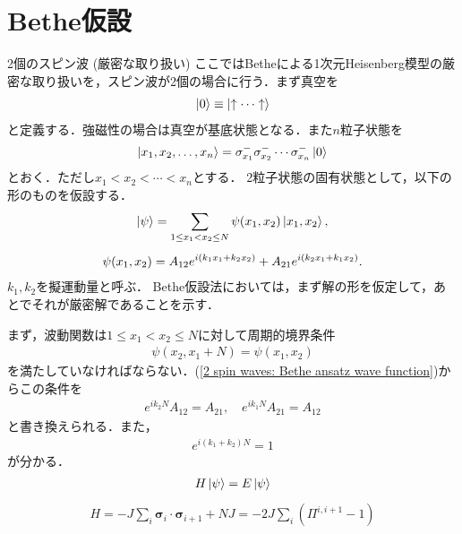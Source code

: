 \documentclass[\main/main.tex]{subfiles}
\begin{document}
\section{Bethe仮設}
\begin{frame}{2個のスピン波 (厳密な取り扱い)}
    ここではBetheによる1次元Heisenberg模型の厳密な取り扱いを，スピン波が2個の場合に行う．まず真空を
    \begin{align}
        \ket{0} \equiv \ket{\uparrow \cdots \uparrow}
    \end{align}
    と定義する．強磁性の場合は真空が基底状態となる．また$n$粒子状態を
    \begin{align}
        \ket{x_1, x_2, \ldots, x_n} = \sigma_{x_1}^- \sigma_{x_2}^- \cdots \sigma_{x_n}^-\ket{0}
    \end{align}
    とおく．ただし$x_1 < x_2 < \cdots < x_n$とする．
    2粒子状態の固有状態として，以下の形のものを仮設する．
    \begin{gather}
        \ket{\psi} = \sum_{1 \le x_1 < x_2 \le N} \psi(x_1, x_2)\ket{x_1, x_2},
        \\[5pt]
        \psi(x_1, x_2) = A_{12}e^{i(k_1 x_1 + k_2 x_2)} + A_{21}e^{i(k_2 x_1 + k_1 x_2)}.
        \label{2 spin waves: Bethe ansatz wave function}
    \end{gather}
    $k_1, k_2$を擬運動量と呼ぶ．
    Bethe仮設法においては，まず解の形を仮定して，あとでそれが厳密解であることを示す．
\end{frame}

\begin{frame}{}
    まず，波動関数は$1 \le x_1 < x_2 \le N$に対して周期的境界条件
    \begin{align}
        \psi(x_2, x_1+N) = \psi(x_1, x_2)
    \end{align}
    を満たしていなければならない．(\ref{2 spin waves: Bethe ansatz wave function})からこの条件を
    \begin{align}
        e^{ik_2N}A_{12} = A_{21},
        \quad
        e^{ik_1N}A_{21} = A_{12}
        \label{2 spin waves: periodic boundary condition}
    \end{align}
    と書き換えられる．また，
    \begin{align}
        e^{i(k_1 + k_2)N} = 1
    \end{align}
    が分かる．
    \begin{align}
        H \ket{\psi} = E\ket{\psi}
    \end{align}
    \begin{align}
        H = -J\sum_i \bm{\sigma}_i \cdot \bm{\sigma}_{i+1} + NJ = -2J\sum_i (\Pi^{i,i+1}-1)
        \label{2 spin waves: Sch-eq}
    \end{align}
\end{frame}
\end{document}
